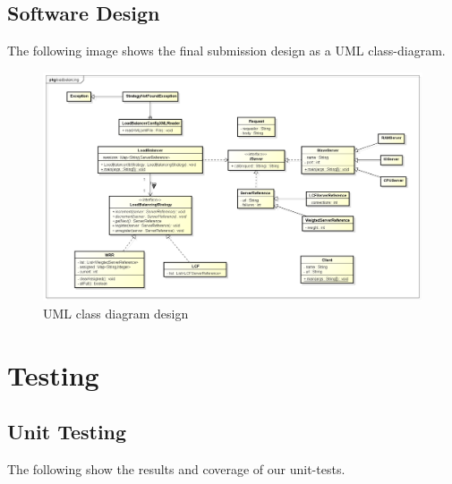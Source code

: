\documentclass[11pt, a4paper]{article}
\begin{document}
\subsection{Software Design}

The following image shows the final submission design as a UML class-diagram.

\begin{figure}[H]
	\centering
	\includegraphics[width=\textwidth]{img/class-diagram}
	\caption{UML class diagram design}
\end{figure}

\section{Testing}

\subsection{Unit Testing}

The following show the results and coverage of our unit-tests.
\end{document}
